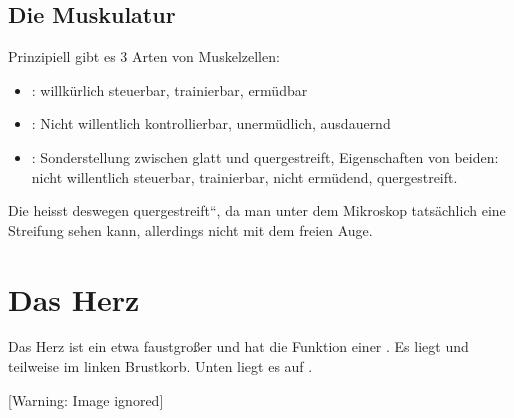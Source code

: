 
\subsection{Die Muskulatur}

Prinzipiell gibt es 3  Arten von Muskelzellen:

\begin{itemize}
    \item {}:
    willk\"urlich steuerbar, trainierbar, er\-m\"ud\-bar
    \item {}: Nicht willentlich
    kontrollierbar, unerm\"udlich, ausdauernd
    \item {}: Sonderstellung zwischen glatt und
    quergestreift, Eigenschaften von beiden: nicht willentlich
    steuerbar, trainierbar, nicht ermüdend, quergestreift.
\end{itemize}

Die  heisst deswegen
{\quotedblbase}quergestreift{\textquotedblleft}, da man unter dem
Mikroskop tats\"achlich eine Streifung sehen kann, allerdings nicht mit
dem freien Auge. 







\section{Das Herz}
Das Herz ist ein etwa faustgro{\ss}er  und
hat die Funktion einer . Es liegt  und teilweise im linken
Brustkorb. Unten liegt es auf .

\begin{center}
 [Warning: Image ignored] %
\end{center}

